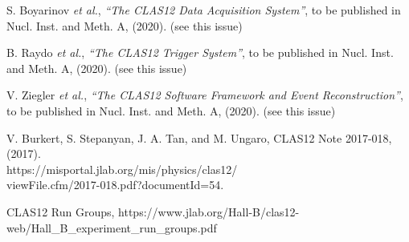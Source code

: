 \documentclass[final,3p,twocolumn]{elsarticle}
\begin{document}
\begin{thebibliography}{99}
S. Boyarinov {\it et al.}, {\it ``The CLAS12 Data Acquisition System''}, to be published in Nucl. Inst.
and Meth. A, (2020). (see this issue)

B. Raydo {\it et al.}, {\it ``The CLAS12 Trigger System''}, to be published in Nucl. Inst. and Meth. A, (2020).
(see this issue)

V. Ziegler {\it et al.}, {\it ``The CLAS12 Software Framework and Event Reconstruction''}, to be published in
  Nucl. Inst. and Meth. A, (2020). (see this issue)

 V. Burkert, S. Stepanyan, J. A. Tan, and M. Ungaro, CLAS12 Note 2017-018, (2017).\\ 
  https://misportal.jlab.org/mis/physics/clas12/\\ viewFile.cfm/2017-018.pdf?documentId=54. 

CLAS12 Run Groups, https://www.jlab.org/Hall-B/clas12-web/Hall\_B\_experiment\_run\_groups.pdf

\end{thebibliography}

\end{document}
